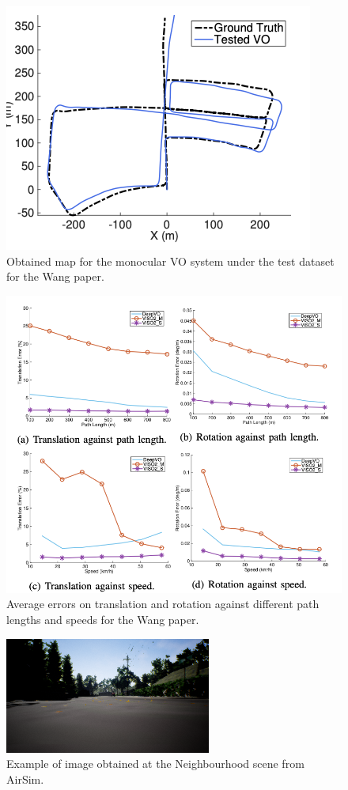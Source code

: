     \begin{figure}[h]
        \centering
        \includegraphics[width=0.65\columnwidth]{figuras/figura12.png}
        \caption{Obtained map for the monocular VO system under the test dataset for the Wang paper.}
        \label{fig:12}
    \end{figure}

    \begin{figure}[h]
        \centering
        \includegraphics[width=0.65\columnwidth]{figuras/figura13.png}
        \caption{Average errors on translation and rotation against different path lengths and speeds for the Wang paper.}
        \label{fig:13}
    \end{figure}
    
    \begin{figure}[h]
        \centering
        \includegraphics[width=0.65\columnwidth]{figuras/neig.png}
        \caption{Example of image obtained at the Neighbourhood scene from AirSim.}
        \label{fig:neig}
    \end{figure}
    
